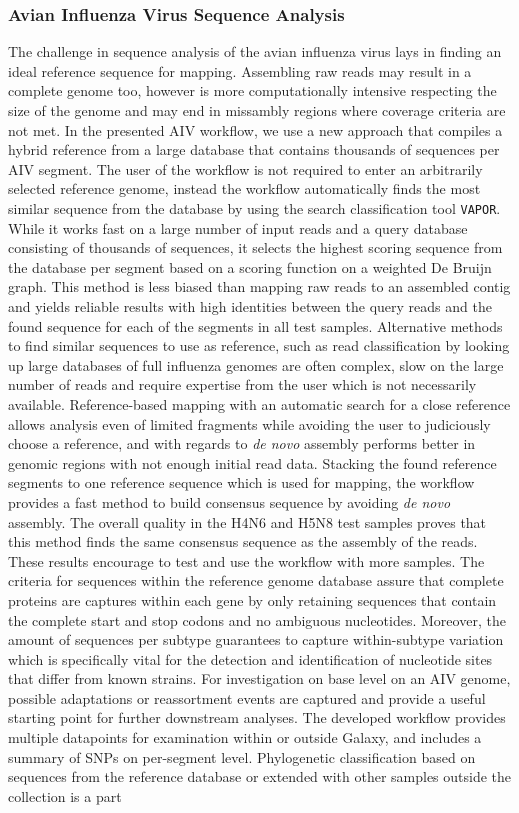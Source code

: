 \subsubsection*{Avian Influenza Virus Sequence Analysis}
The challenge in sequence analysis of the avian influenza virus lays in finding an ideal reference sequence for mapping. Assembling raw reads may result in a complete genome too, however is more computationally intensive respecting the size of the genome and may end in missambly regions where coverage criteria are not met. In the presented \ac{AIV} workflow, we use a new approach that compiles a hybrid reference from a large database that contains thousands of sequences per \ac{AIV} segment. The user of the workflow is not required to enter an arbitrarily selected reference genome, instead the workflow automatically finds the most similar sequence from the database by using the search classification tool \texttt{VAPOR}. While it works fast on a large number of input reads and a query database consisting of thousands of sequences, it selects the highest scoring sequence from the database per segment based on a scoring function on a weighted De Bruijn graph. This method is less biased than mapping raw reads to an assembled contig and yields reliable results with high identities between the query reads and the found sequence for each of the segments in all test samples. Alternative methods to find similar sequences to use as reference, such as read classification by looking up large databases of full influenza genomes are often complex, slow on the large number of reads and require expertise from the user which is not necessarily available. Reference-based mapping with an automatic search for a close reference allows analysis even of limited fragments while avoiding the user to judiciously choose a reference, and with regards to \textit{de novo} assembly performs better in genomic regions with not enough initial read data. Stacking the found reference segments to one reference sequence which is used for mapping, the workflow provides a fast method to build consensus sequence by avoiding \textit{de novo} assembly. The overall quality in the H4N6 and H5N8 test samples proves that this method finds the same consensus sequence as the assembly of the reads. These results encourage to test and use the workflow with more samples. The criteria for sequences within the reference genome database assure that complete proteins are captures within each gene by only retaining sequences that contain the complete start and stop codons and no ambiguous nucleotides. Moreover, the amount of sequences per subtype guarantees to capture within-subtype variation which is specifically vital for the detection and identification of nucleotide sites that differ from known strains. For investigation on base level on an \ac{AIV} genome, possible adaptations or reassortment events are captured and provide a useful starting point for further downstream analyses. The developed workflow provides multiple datapoints for examination within or outside Galaxy, and includes a summary of \acp{SNP} on per-segment level. Phylogenetic classification based on sequences from the reference database or extended with other samples outside the collection is a part 